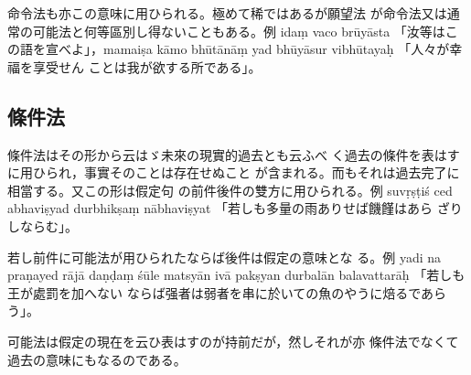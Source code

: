 命令法も亦この意味に用ひられる。極めて稀ではあるが願望法
が命令法又は通常の可能法と何等區別し得ないこともある。例
idaṃ vaco brūyāsta 「汝等はこの語を宣べよ」，mamaiṣa kāmo
bhūtānāṃ yad bhūyāsur vibhūtayaḥ 「人々が幸福を享受せん
ことは我が欲する所である」。

\subsection{條件法}
\numberParagraph
條件法はその形から云はゞ未來の現實的過去とも云ふべ
く過去の條件を表はすに用ひられ，事實そのことは存在せぬこと
が含まれる。而もそれは過去完了に相當する。又この形は假定句
の前件後件の雙方に用ひられる。例 suvṛṣṭiś ced abhaviṣyad
durbhikṣaṃ nābhaviṣyat 「若しも多量の雨ありせば饑饉はあら
ざりしならむ」。

若し前件に可能法が用ひられたならば後件は假定の意味とな
る。例 yadi na praṇayed rājā daṇḍaṃ śūle matsyān ivā\-%
pakṣyan durbalān balavattarāḥ 「若しも王が處罰を加へない
ならば强者は弱者を串に於いての魚のやうに焙るであらう」。

可能法は假定の現在を云ひ表はすのが持前だが，然しそれが亦
條件法でなくて過去の意味にもなるのである。

\newpage
\theendnotes


